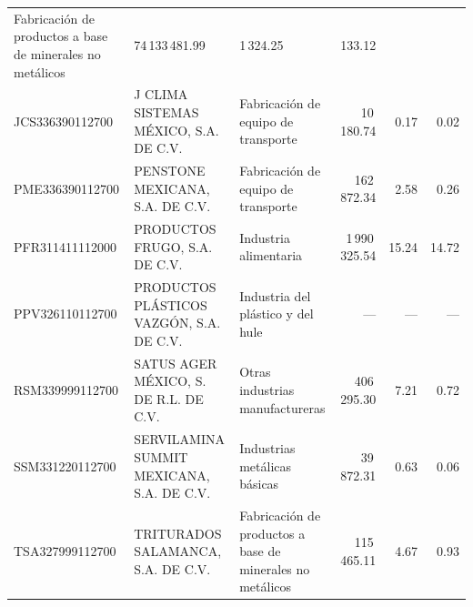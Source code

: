 {\begin{longtable}{@{}L{.16\textwidth} L{.25\textwidth} L{.19\textwidth} r r r@{}}
Fabricación de productos a base de minerales no metálicos &
74\,133\,481.99 & 1\,324.25 & 133.12 \\
JCS336390112700 & J CLIMA SISTEMAS MÉXICO, S.A. DE C.V. &
Fabricación de equipo de transporte & 10\,180.74 & 0.17 & 0.02 \\
PME336390112700 & PENSTONE MEXICANA, S.A. DE C.V. &
Fabricación de equipo de transporte & 162\,872.34 & 2.58 & 0.26 \\
PFR311411112000 & PRODUCTOS FRUGO, S.A. DE C.V. &
Industria alimentaria & 1\,990\,325.54 & 15.24 & 14.72 \\
PPV326110112700 & PRODUCTOS PLÁSTICOS VAZGÓN, S.A. DE C.V. &
Industria del plástico y del hule & --- & --- & --- \\
RSM339999112700 & SATUS AGER MÉXICO, S. DE R.L. DE C.V. &
Otras industrias manufactureras & 406\,295.30 & 7.21 & 0.72 \\
SSM331220112700 & SERVILAMINA SUMMIT MEXICANA, S.A. DE C.V. &
Industrias metálicas básicas & 39\,872.31 & 0.63 & 0.06 \\
TSA327999112700 & TRITURADOS SALAMANCA, S.A. DE C.V. &
Fabricación de productos a base de minerales no metálicos &
115\,465.11 & 4.67 & 0.93 \\
\end{longtable}}

